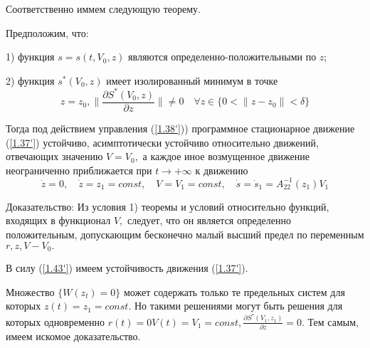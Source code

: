 Соответственно иммем следующую теорему.

\begin{theorem}\label{t-1.10}
Предположим, что:

1) функция $s = s(t, V_0, z)$ являются определенно-положительными по $z$;

2) функция $s^{*} (V_0, z)$ имеет изолированный минимум в точке 
$$z = z_0, \| \frac{\partial S^{*} (V_0, z)}{\partial z} \| \ne 0 \quad \forall z \in \lbrace 0 < \| z - z_0 \| < \delta \rbrace$$

Тогда под действием управления (\ref{1.38'})) программное стационарное движение (\ref{1.37'}) устойчиво, асимптотически устойчиво относительно движений, отвечающих значению $V = V_0,$ а каждое иное возмущенное движение неограниченно приближается при $t \to + \infty$ к движению 
$$\dot z = 0, \quad \dot z = z_1 = const, \quad V = V_1 = const, \quad \dot s = \dot s_1 = A_{22}^{-1} (z_1) V_1$$
\end{theorem}

Доказательство:
Из условия 1) теоремы и условий относительно функций, входящих в функционал $V,$ следует, что он является определенно положительным, допускающим бесконечно малый высший предел по переменным $r, z, V - V_0.$

В силу (\ref{1.43'}) имеем устойчивость движения (\ref{1.37'}).

Множество $\lbrace W(z_t) = 0 \rbrace$ может содержать только те предельных систем для которых $z(t) = z_1 = const.$ Но такими решениями могут быть решения для которых одновременно $r(t) = 0 V(t) = V_1 = const, \frac{\partial S^{*} (V_1, z_1)}{\partial z} = 0.$ Тем самым, имеем искомое доказательство. 